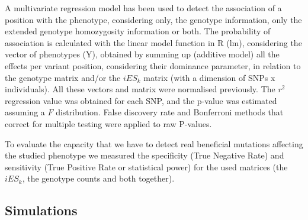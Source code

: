 \documentclass[a4paper,11pt]{article}
\begin{document}

A  multivariate regression model has been used to detect the association of a position with the phenotype, considering only, the genotype information, only the extended genotype homozygosity information or both. The probability of association is calculated with the linear model function in R (lm), considering the vector of phenotypes (Y), obtained by summing up (additive model) all the effects per variant position, considering their dominance parameter, in relation to the genotype matrix and/or the ${iES_k}$ matrix  (with a dimension of SNPs x individuals). All these vectors and matrix were normalised previously. The $r^2$ regression value was obtained for each SNP, and the p-value was estimated assuming a $F$ distribution. False discovery rate and Bonferroni methods \citep{Benjamini:1995aa} that correct for multiple testing were applied to raw P-values. \par
To evaluate the capacity that we have to detect real beneficial mutations affecting the studied phenotype we measured the specificity (True Negative Rate) and sensitivity (True Positive Rate or statistical power) for the used matrices (the $iES_k$, the genotype counts and both together). %


\subsection{Simulations}

\end{document}
